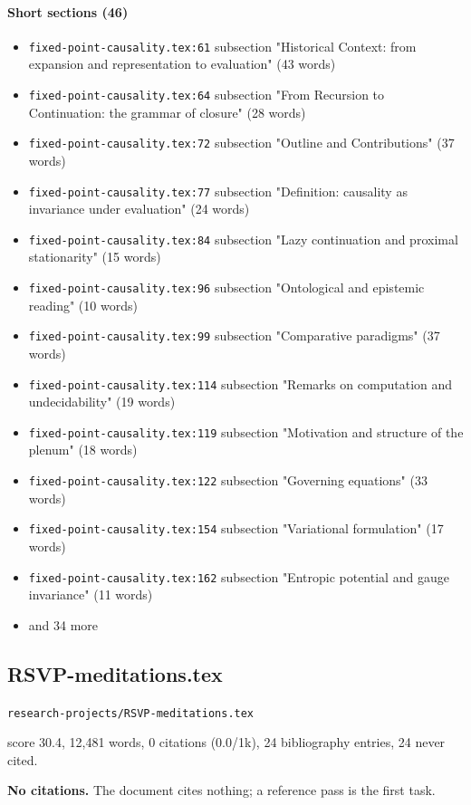 \documentclass[11pt]{article}
\newcommand{\loc}[1]{{\small\color{muted}\texttt{#1}}}
\begin{document}
\paragraph{Short sections (46)}
\begin{itemize}
\item \loc{fixed-point-causality.tex:61} subsection "Historical Context: from expansion and representation to evaluation" (43 words)
\item \loc{fixed-point-causality.tex:64} subsection "From Recursion to Continuation: the grammar of closure" (28 words)
\item \loc{fixed-point-causality.tex:72} subsection "Outline and Contributions" (37 words)
\item \loc{fixed-point-causality.tex:77} subsection "Definition: causality as invariance under evaluation" (24 words)
\item \loc{fixed-point-causality.tex:84} subsection "Lazy continuation and proximal stationarity" (15 words)
\item \loc{fixed-point-causality.tex:96} subsection "Ontological and epistemic reading" (10 words)
\item \loc{fixed-point-causality.tex:99} subsection "Comparative paradigms" (37 words)
\item \loc{fixed-point-causality.tex:114} subsection "Remarks on computation and undecidability" (19 words)
\item \loc{fixed-point-causality.tex:119} subsection "Motivation and structure of the plenum" (18 words)
\item \loc{fixed-point-causality.tex:122} subsection "Governing equations" (33 words)
\item \loc{fixed-point-causality.tex:154} subsection "Variational formulation" (17 words)
\item \loc{fixed-point-causality.tex:162} subsection "Entropic potential and gauge invariance" (11 words)
\item[] {\color{muted}\small and 34 more}
\end{itemize}
\subsection{RSVP-meditations.tex}
\loc{research-projects/\allowbreak{}RSVP-meditations.tex}\par
score 30.4, 12,481 words, 0 citations (0.0/1k), 24 bibliography entries, 24 never cited.

\textbf{No citations.} The document cites nothing; a reference pass is the first task.
\end{document}
